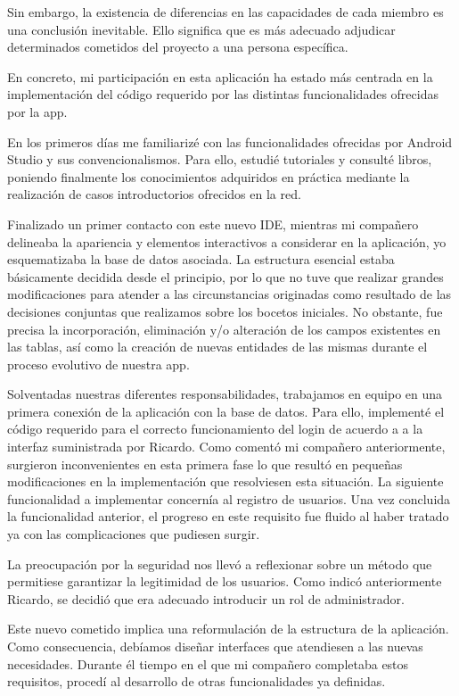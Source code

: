 \documentclass[11pt,spanish,
		listoftables,listoffigures]
		{tfgplantilla}
\begin{document}
Sin embargo, la existencia de diferencias en las capacidades de cada miembro es una conclusión inevitable. Ello significa que es más adecuado adjudicar determinados cometidos del proyecto a una persona específica.

En concreto, mi participación en esta aplicación ha estado más centrada en la implementación del código requerido por las distintas funcionalidades ofrecidas por la app.

En los primeros días me familiarizé con las funcionalidades ofrecidas por Android Studio y sus convencionalismos. Para ello, estudié tutoriales y consulté libros, poniendo finalmente los conocimientos adquiridos en práctica mediante la realización de casos introductorios ofrecidos en la red.

Finalizado un primer contacto con este nuevo IDE, mientras mi compañero delineaba la apariencia y elementos interactivos a considerar en la aplicación, yo esquematizaba la base de datos asociada. La estructura esencial estaba básicamente decidida desde el principio, por lo que no tuve que realizar grandes modificaciones para atender a las circunstancias originadas como resultado de las decisiones conjuntas que realizamos sobre los bocetos iniciales. No obstante, fue precisa la incorporación, eliminación y/o alteración de los campos existentes en las tablas, así como la creación de nuevas entidades de las mismas durante el proceso evolutivo de nuestra app. 

Solventadas nuestras diferentes responsabilidades, trabajamos en equipo en una primera conexión de la aplicación con la base de datos. Para ello, implementé el código requerido para el correcto funcionamiento del login de acuerdo a a la interfaz suministrada por Ricardo. Como comentó mi compañero anteriormente, surgieron inconvenientes en esta primera fase lo que resultó en pequeñas modificaciones en la implementación que resolviesen esta situación.
La siguiente funcionalidad a implementar concernía al registro de usuarios. Una vez concluida la funcionalidad anterior, el progreso en este requisito fue fluido al haber tratado ya con las complicaciones que pudiesen surgir.

La preocupación por la seguridad nos llevó a reflexionar sobre un método que permitiese garantizar la legitimidad de los usuarios. Como indicó anteriormente Ricardo, se decidió que era adecuado introducir un rol de administrador.

Este nuevo cometido implica una reformulación de la estructura de la aplicación. Como consecuencia, debíamos diseñar interfaces que atendiesen a las nuevas necesidades. Durante él tiempo en el que mi compañero completaba estos requisitos, procedí al desarrollo de otras funcionalidades ya definidas.
\end{document}
